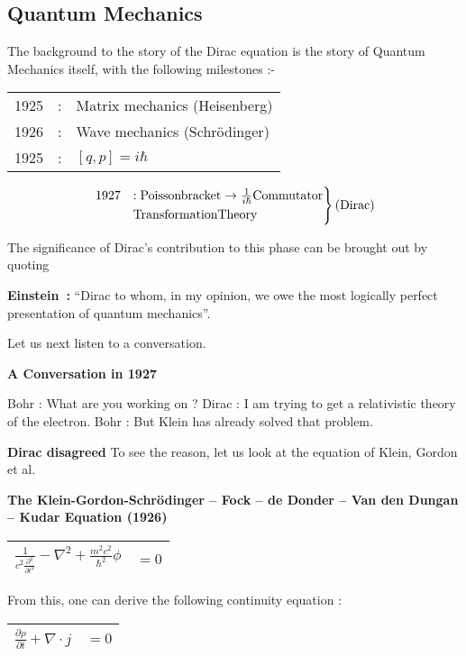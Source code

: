 \subsection*{Quantum Mechanics}

The background to the story of the Dirac equation is the story of Quantum Mechanics itself, with the following milestones :-
\begin{center}
\begin{tabular}{lcl}
	1925		&:&	Matrix mechanics (Heisenberg)\\
	1926		&:&	Wave mechanics (Schrödinger)\\
	1925		&:&	$[q, p] = i\hbar$
\end{tabular}
\begin{equation*}
\begin{rcases}
  1927 &:  {\rm Poisson bracket} \rightarrow\frac{1}{i \hbar}  {\rm  Commutator} \\
       & {\rm Transformation Theory} \\
\end{rcases}
\text{(Dirac)}
\end{equation*}
\end{center}
The significance of Dirac’s contribution to this phase can be brought out by quoting

\textbf{Einstein~:}	“Dirac to whom, in my opinion, we owe the most logically perfect presentation of quantum mechanics”.

Let us next listen to a conversation.

\textbf{A Conversation in 1927}

Bohr		:	What are you working on ?
Dirac		:	I am trying to get a relativistic theory of the electron.
Bohr		:	But Klein has already solved that problem.

\textbf{Dirac disagreed} To see the reason, let us look at the equation of Klein, Gordon et al.

\textbf{The Klein-Gordon-Schrödinger – Fock – de Donder – Van den Dungan – Kudar Equation (1926)}

\begin{tabular}{|cc|}
\hline
$\frac{1}{c^{2} \frac{\partial^{2}}{\partial t^{2}}} - \nabla^{2} + \frac{m^{2} c^{2}}{\hbar^{2}}\phi$ &$=0$\\
\hline
\end{tabular}

From this, one can derive the following continuity equation :

\begin{tabular}{|cc|}
\hline
$\frac{\partial \rho}{\partial t} + \nabla \cdot j$ &$=0$\\
\hline
\end{tabular}


